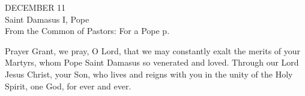 \begin{center}\normalsize DECEMBER 11\\
\footnotesize Saint Damasus I, Pope\\
\footnotesize From the Common of Pastors: For a Pope p.\\
\end{center}

Prayer 
Grant, we pray, O Lord,
that we may constantly exalt the merits of your Martyrs,
whom Pope Saint Damasus so venerated and loved.
Through our Lord Jesus Christ, your Son,
who lives and reigns with you in the unity of the Holy Spirit,
one God, for ever and ever.

